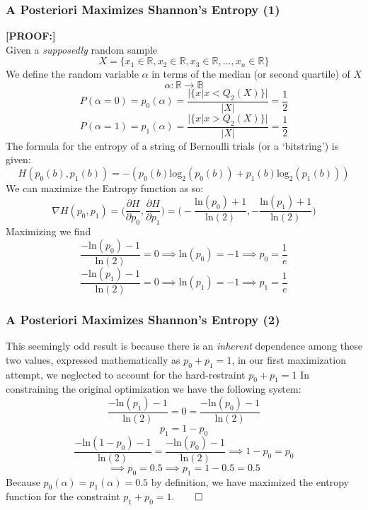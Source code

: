 \documentclass{beamer}
\begin{document}
\begin{frame}
\frametitle{A Posteriori Maximizes Shannon's Entropy (1)}
{\tiny
\textbf{[PROOF:]}\\
\vspace{0.5 em}
Given a \textit{supposedly} random sample $$X = \{x_1 \in \mathbb{R},x_2\in \mathbb{R},x_3\in \mathbb{R},...,x_n\in \mathbb{R}\}$$We define the random variable $\alpha$ in terms of the median (or second quartile) of $X$ $$\alpha:\mathbb{R}\to\mathbb{B}$$ $$P(\alpha =  0) = p_0(\alpha) = \frac{\vert\{x\vert x<Q_2(X)\}\vert}{\vert X \vert} = \frac{1}{2} $$ $$P(\alpha =  1) = p_1(\alpha) = \frac{\vert\{x\vert x>Q_2(X)\}\vert}{\vert X \vert} = \frac{1}{2}$$The formula for the entropy of a string of Bernoulli trials (or a `bitstring') is given:$$H(p_0(b),p_1(b)) = -(p_0(b)\textrm{log}_2(p_0(b)) +p_1(b)\textrm{log}_2(p_1(b)))$$ We can maximize the Entropy function as so:$$\nabla H(p_0,p_1) = \Big(\frac{\partial H}{\partial p_0},\frac{\partial H}{\partial p_1}\Big) = \Big(-\frac{\textrm{ln}(p_0) + 1}{\textrm{ln}(2)},-\frac{\textrm{ln}(p_1) + 1}{\textrm{ln}(2)}\Big)$$Maximizing we find$$\frac{-\textrm{ln}(p_0) - 1}{\textrm{ln}(2)} = 0 \implies \textrm{ln}(p_0) = -1 \implies p_0 = \frac{1}{e}$$ $$\frac{-\textrm{ln}(p_1) - 1}{\textrm{ln}(2)} = 0 \implies \textrm{ln}(p_1) = -1 \implies p_1 = \frac{1}{e}$$}
\end{frame}
\begin{frame}
\frametitle{A Posteriori Maximizes Shannon's Entropy (2)}
{\tiny This seemingly odd result is because there is an \textit{inherent} dependence among these two values, expressed mathematically as $p_0 + p_1 = 1$, in our first maximization attempt, we neglected to account for the hard-restraint $p_0 +p_1 = 1$ In constraining the original optimization we have the following system: 
$$\frac{-\textrm{ln}(p_1) - 1}{\textrm{ln}(2)} = 0 = \frac{-\textrm{ln}(p_0) - 1}{\textrm{ln}(2)}$$
$$ p_1 = 1-p_0$$
$$ \frac{-\textrm{ln}(1-p_0) - 1}{\textrm{ln}(2)} = \frac{-\textrm{ln}(p_0) - 1}{\textrm{ln}(2)} \implies 1-p_0 = p_0$$$$ \implies p_0 = 0.5 \implies p_1 = 1 - 0.5 = 0.5$$Because $p_0(\alpha) = p_1(\alpha) = 0.5$ by definition, we have maximized the entropy function for the constraint $p_1 + p_0 = 1$.\hfill  $\qed$}
\end{frame}
\end{document}
